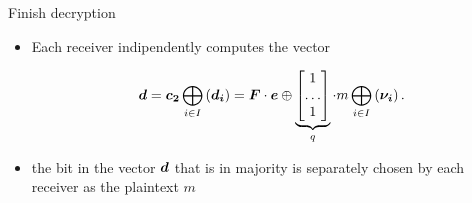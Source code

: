 \begin{frame}
\begin{overprint}
 \begin{block}{Finish decryption}
 \begin{itemize}
  \item<19-> Each receiver indipendently computes the vector 
 
%  
 \begin{eqnarray*}
 \boldsymbol{d} =  \boldsymbol{c_2} \bigoplus_{i \in I} \left( \boldsymbol{d_i} \right)  
 	  =  \boldsymbol{F}\cdot \boldsymbol{e} \mathbin{\oplus} \underbrace{\begin{bmatrix} 1 \\ \dots \\ 1 \end{bmatrix}}_{q} \cdot m \bigoplus_{i \in I} \left( \boldsymbol{\nu_i} \right) .
 \end{eqnarray*}
 
 \item<21> the bit in the vector $\boldsymbol{d}$ that is in majority is separately chosen by each receiver as the plaintext $m$
 \end{itemize}
 \end{block}
 
\end{overprint}


  

\end{frame}

